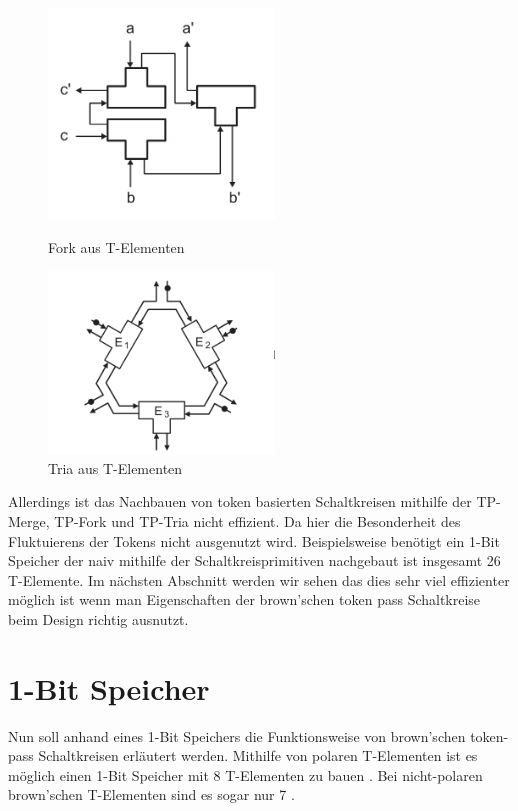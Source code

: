 \documentclass[11pt,a4paper]{article}
\begin{document}
\begin{figure}[h]
     \begin{minipage}{0.45\textwidth}
        \centering
        \includegraphics[width=6cm]{bilder/TP_Fork.png}
        \caption{Fork aus T-Elementen}
    \end{minipage}\hfill
     \begin{minipage}{0.45\textwidth}
        \centering
        \includegraphics[width=6cm]{bilder/TP_Tria.png}
        \caption{Tria aus T-Elementen}
    \end{minipage}\hfill
\end{figure}    

%
Allerdings ist das Nachbauen von token basierten Schaltkreisen mithilfe
der TP-Merge, TP-Fork und TP-Tria nicht effizient.
%
Da hier die Besonderheit des Fluktuierens der Tokens nicht ausgenutzt wird.
%
Beispielsweise benötigt ein 1-Bit Speicher der naiv mithilfe der 
Schaltkreisprimitiven nachgebaut ist insgesamt 26 T-Elemente.
%
Im nächsten Abschnitt werden wir sehen das dies 
sehr viel effizienter möglich ist wenn man Eigenschaften der brown'schen 
token pass Schaltkreise beim Design richtig ausnutzt.

\section{1-Bit Speicher}
Nun soll anhand eines 1-Bit Speichers die Funktionsweise von brown'schen 
token-pass Schaltkreisen erläutert werden.
%
Mithilfe von polaren T-Elementen ist es möglich einen 1-Bit Speicher mit 8
T-Elementen zu bauen \cite{Peper_Fundamentals_2013}. 
%
Bei nicht-polaren brown'schen T-Elementen sind es sogar
nur 7 \cite{Peper_nonPolar_2018}.
%
\end{document}
